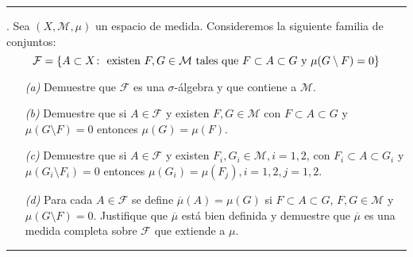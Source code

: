 \documentclass[11pt]{report}
\begin{document}
\hrule

\vspace{4mm}

. Sea $(X,\mathcal{M},\mu)$ un espacio de medida. Consideremos la siguiente familia de conjuntos:
\[\mathcal{F}=\{A \subset X \colon \textup{ existen } F,G \in \mathcal{M} \textup{ tales que } F \subset A \subset G \textup{ y } \mu(G \setminus F)=0\}\]
\begin{itemize}
    \item[\textit{(a)}] Demuestre que $\mathcal{F}$ es una $\sigma$-álgebra y que contiene a $\mathcal{M}$.
    \item[\textit{(b)}] Demuestre que si $A \in \mathcal{F}$ y existen $F,G\in \mathcal{M}$ con $F \subset A \subset G$ y $\mu(G\setminus F)=0$ entonces $\mu(G)=\mu(F)$.
    \item[\textit{(c)}] Demuestre que si $A \in \mathcal{F}$ y existen $F_i,G_i \in \mathcal{M}, i=1,2$, con $F_i\subset A\subset G_i$ y $\mu(G_i\setminus F_i)=0$ entonces $\mu(G_i)=\mu(F_j),i=1,2,j=1,2$.
    \item[\textit{(d)}] Para cada $A \in \mathcal{F}$ se define $\overline{\mu}(A)=\mu(G)$ si $F \subset A \subset G$, $F,G \in \mathcal{M}$ y $\mu(G\setminus F) = 0$. Justifique que $\overline{\mu}$ está bien definida y demuestre que $\overline{\mu}$ es una medida completa sobre $\mathcal{F}$ que extiende a $\mu$.
\end{itemize}

\vspace{2mm}

\hrule

\vspace{2mm}
\end{document}
